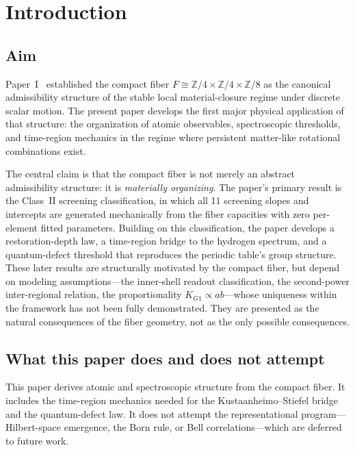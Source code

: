 \documentclass[11pt,a4paper]{article}
\begin{document}
\section{Introduction}
\label{sec:intro}

\subsection{Aim}

Paper~I~\cite{Wells2026a} established the compact fiber $F \cong \mathbb{Z}/4 \times \mathbb{Z}/4 \times \mathbb{Z}/8$ as the canonical admissibility structure of the stable local material-closure regime under discrete scalar motion. The present paper develops the first major physical application of that structure: the organization of atomic observables, spectroscopic thresholds, and time-region mechanics in the regime where persistent matter-like rotational combinations exist.

The central claim is that the compact fiber is not merely an abstract admissibility structure: it is \emph{materially organizing}. The paper's primary result is the Class~II screening classification, in which all 11 screening slopes and intercepts are generated mechanically from the fiber capacities with zero per-element fitted parameters. Building on this classification, the paper develops a restoration-depth law, a time-region bridge to the hydrogen spectrum, and a quantum-defect threshold that reproduces the periodic table's group structure. These later results are structurally motivated by the compact fiber, but depend on modeling assumptions---the inner-shell readout classification, the second-power inter-regional relation, the proportionality $K_{G1} \propto ab$---whose uniqueness within the framework has not been fully demonstrated. They are presented as the natural consequences of the fiber geometry, not as the only possible consequences.

\subsection{What this paper does and does not attempt}

This paper derives atomic and spectroscopic structure from the compact fiber. It includes the time-region mechanics needed for the Kustaanheimo--Stiefel bridge and the quantum-defect law. It does not attempt the representational program---Hilbert-space emergence, the Born rule, or Bell correlations---which are deferred to future work.
\end{document}
